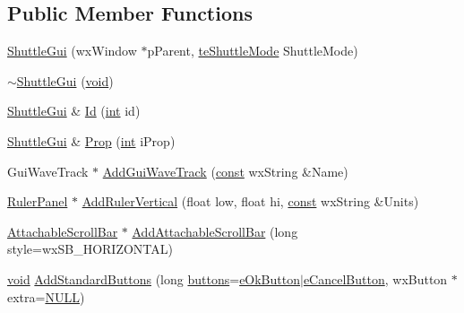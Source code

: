 \subsection*{Public Member Functions}
\begin{DoxyCompactItemize}
\item 
\hyperlink{class_shuttle_gui_aeaa15ca77a3a935354792a70e1d904e5}{Shuttle\+Gui} (wx\+Window $\ast$p\+Parent, \hyperlink{_shuttle_gui_8h_a0c8bf96cca5e5b020b22818e8490b964}{te\+Shuttle\+Mode} Shuttle\+Mode)
\item 
\hyperlink{class_shuttle_gui_aae1a4c070f9234c7ee5b22847a4df898}{$\sim$\+Shuttle\+Gui} (\hyperlink{sound_8c_ae35f5844602719cf66324f4de2a658b3}{void})
\item 
\hyperlink{class_shuttle_gui}{Shuttle\+Gui} \& \hyperlink{class_shuttle_gui_a0db2f531b7bd17f72c211883151f5640}{Id} (\hyperlink{xmltok_8h_a5a0d4a5641ce434f1d23533f2b2e6653}{int} id)
\item 
\hyperlink{class_shuttle_gui}{Shuttle\+Gui} \& \hyperlink{class_shuttle_gui_a9b08b8ed4659c593cef65df97f0e0c13}{Prop} (\hyperlink{xmltok_8h_a5a0d4a5641ce434f1d23533f2b2e6653}{int} i\+Prop)
\item 
Gui\+Wave\+Track $\ast$ \hyperlink{class_shuttle_gui_a71bda986f84af799c0bd3166714370b0}{Add\+Gui\+Wave\+Track} (\hyperlink{getopt1_8c_a2c212835823e3c54a8ab6d95c652660e}{const} wx\+String \&Name)
\item 
\hyperlink{class_ruler_panel}{Ruler\+Panel} $\ast$ \hyperlink{class_shuttle_gui_af30fb80eb784130243834dda1dd4b869}{Add\+Ruler\+Vertical} (float low, float hi, \hyperlink{getopt1_8c_a2c212835823e3c54a8ab6d95c652660e}{const} wx\+String \&Units)
\item 
\hyperlink{class_attachable_scroll_bar}{Attachable\+Scroll\+Bar} $\ast$ \hyperlink{class_shuttle_gui_abc507250638a055a0a7b68e10ec61eaa}{Add\+Attachable\+Scroll\+Bar} (long style=wx\+S\+B\+\_\+\+H\+O\+R\+I\+Z\+O\+N\+T\+AL)
\item 
\hyperlink{sound_8c_ae35f5844602719cf66324f4de2a658b3}{void} \hyperlink{class_shuttle_gui_a213ba484f310ae2851d118ccafb08f34}{Add\+Standard\+Buttons} (long \hyperlink{winmain_8cpp_aa4250fecc19d9977f24b66fdac73f301}{buttons}=\hyperlink{_shuttle_gui_8h_a727cc1d940fa1a6396c79b0f86a72653a0a78af2954b9dbff02888eaf8578c956}{e\+Ok\+Button}$\vert$\hyperlink{_shuttle_gui_8h_a727cc1d940fa1a6396c79b0f86a72653a437edfe9a451612a4bd6fd50f2caf4c5}{e\+Cancel\+Button}, wx\+Button $\ast$extra=\hyperlink{px__mixer_8h_a070d2ce7b6bb7e5c05602aa8c308d0c4}{N\+U\+LL})
\item 

\end{DoxyCompactItemize}
